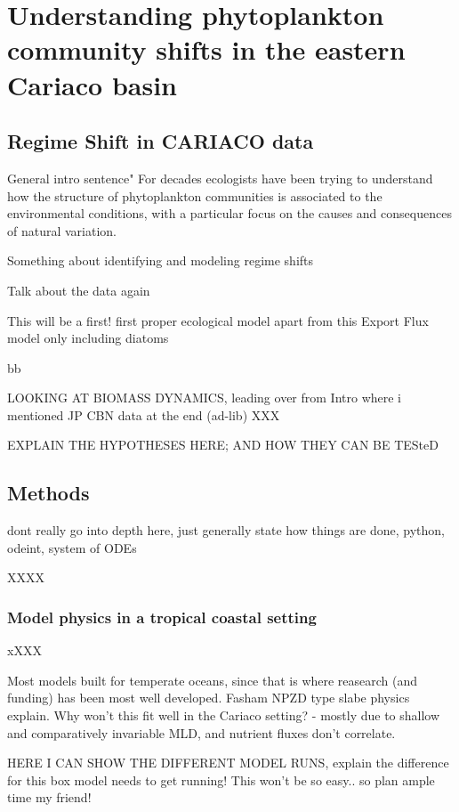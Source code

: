 \chapter{Understanding phytoplankton community shifts in the eastern Cariaco basin}

\small {\textbf{}}


\normalsize
\section{Regime Shift in CARIACO data}
General intro sentence" For decades ecologists have been trying to understand how the structure of phytoplankton communities is associated to the environmental conditions, with a particular focus on the causes and consequences of natural variation.

Something about identifying and modeling regime shifts

Talk about the data again

This will be a first! first proper ecological model apart from this Export Flux model only including diatoms \citep{Walsh2002a}


bb


LOOKING AT BIOMASS DYNAMICS, leading over from Intro where i mentioned JP CBN data at the end (ad-lib)
XXX

EXPLAIN THE HYPOTHESES HERE; AND HOW THEY CAN BE TESteD

\section{Methods}


dont really go into depth here, just generally state how things are done, python, odeint, system of ODEs

XXXX

\subsection{Model physics in a tropical coastal setting}
xXXX

Most models built for temperate oceans, since that is where reasearch (and funding) has been most well developed. Fasham NPZD type slabe physics explain.
Why won't this fit well in the Cariaco setting? - mostly due to shallow and comparatively invariable MLD, and nutrient fluxes don't correlate.

HERE I CAN SHOW THE DIFFERENT MODEL RUNS, explain the difference
for this box model needs to get running! This won't be so easy.. so plan ample time my friend!

